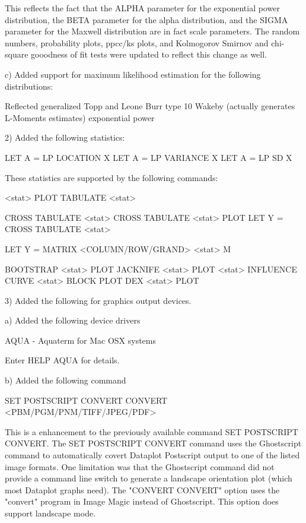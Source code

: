 {       This reflects the fact that the ALPHA parameter for the
       exponential power distribution, the BETA parameter for the
       alpha distribution, and the SIGMA parameter for the Maxwell
       distribution are in fact scale parameters.  The random numbers,
       probability plots, ppcc/ks plots, and Kolmogorov
       Smirnov and chi-square gooodness of fit tests were
       updated to reflect this change as well.

    c) Added support for maximum likelihood estimation for
       the following distributions:

       Reflected generalized Topp and Leone
       Burr type 10
       Wakeby  (actually generates L-Moments estimates)
       exponential power

 2) Added the following statistics:

       LET A = LP LOCATION X
       LET A = LP VARIANCE X
       LET A = LP SD X

    These statistics are supported by the following commands:

        <stat> PLOT
        TABULATE <stat> 

        CROSS TABULATE <stat> 
        CROSS TABULATE <stat> PLOT
        LET Y = CROSS TABULATE <stat>

        LET Y = MATRIX <COLUMN/ROW/GRAND> <stat> M

        BOOTSTRAP <stat> PLOT
        JACKNIFE <stat> PLOT
        <stat> INFLUENCE CURVE
        <stat> BLOCK PLOT
        DEX <stat> PLOT

 3) Added the following for graphics output devices.

    a) Added the following device drivers

         AQUA    - Aquaterm for Mac OSX systems

                   Enter HELP AQUA for details.

    b) Added the following command
 
         SET POSTSCRIPT CONVERT CONVERT <PBM/PGM/PNM/TIFF/JPEG/PDF>

       This is a enhancement to the previously available
       command SET POSTSCRIPT CONVERT.  The SET POSTSCRIPT CONVERT
       command uses the Ghostscript command to automatically
       covert Dataplot Postscript output to one of the listed
       image formats.  One limitation was that the Ghostscript
       command did not provide a command line switch to
       generate a landscape orientation plot (which most
       Dataplot graphs need).  The "CONVERT CONVERT" option
       uses the "convert" program in Image Magic instead of
       Ghostscript.   This option does support landscape
       mode.

}
